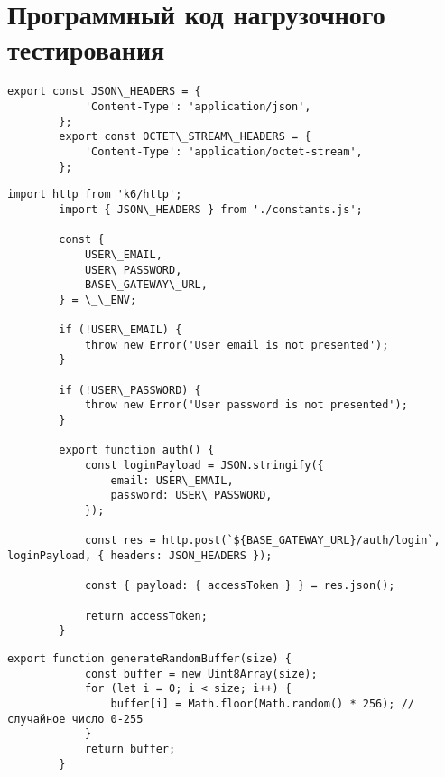 \chapter{Программный код нагрузочного тестирования}

	\begin{lstlisting}[caption={constants.js}]
		export const JSON\_HEADERS = {
			'Content-Type': 'application/json',
		};
		export const OCTET\_STREAM\_HEADERS = {
			'Content-Type': 'application/octet-stream',
		};
	\end{lstlisting}

	\begin{lstlisting}[caption={auth.js}]
		import http from 'k6/http';
		import { JSON\_HEADERS } from './constants.js';
		
		const {
			USER\_EMAIL,
			USER\_PASSWORD,
			BASE\_GATEWAY\_URL,
		} = \_\_ENV;
		
		if (!USER\_EMAIL) {
			throw new Error('User email is not presented');
		}
		
		if (!USER\_PASSWORD) {
			throw new Error('User password is not presented');
		}
		
		export function auth() {
			const loginPayload = JSON.stringify({
				email: USER\_EMAIL,
				password: USER\_PASSWORD,
			});
			
			const res = http.post(`${BASE_GATEWAY_URL}/auth/login`, loginPayload, { headers: JSON_HEADERS });
			
			const { payload: { accessToken } } = res.json();
			
			return accessToken;
		}
	\end{lstlisting}

	\begin{lstlisting}[caption={utils.js}]
		export function generateRandomBuffer(size) {
			const buffer = new Uint8Array(size);
			for (let i = 0; i < size; i++) {
				buffer[i] = Math.floor(Math.random() * 256); // случайное число 0-255
			}
			return buffer;
		}
	\end{lstlisting}

